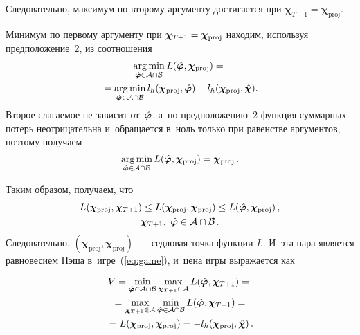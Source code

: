\begin{multicols}{2}
Следовательно, максимум по второму аргументу достигается при
$\boldsymbol{\chi}_{T+1} = \boldsymbol{\chi}_{\mathrm{proj}}$.

Минимум по первому аргументу при $\boldsymbol{\chi}_{T+1}\hm =
\boldsymbol{\chi}_{\mathrm{proj}}$ находим, используя
предположение~2, из соотношения
\begin{multline*}
    \mathop{\mathrm{arg}\,\mathrm{min}}\limits_{\hat{\boldsymbol{\varphi}} \in \mathcal{A} \cap \mathcal{B}} L(\hat{\boldsymbol{\varphi}},
    \boldsymbol{\chi}_{\mathrm{proj}}) ={}\\
    {}=
    \mathop{\mathrm{arg}\,\mathrm{min}}\limits_{\hat{\boldsymbol{\varphi}} \in \mathcal{A} \cap \mathcal{B}}
    l_h(\boldsymbol{\chi}_{\mathrm{proj}}, \hat{\boldsymbol{\varphi}})
    - l_h(\boldsymbol{\chi}_{\mathrm{proj}}, \hat{\boldsymbol{\chi}}).
\end{multline*}
Второе слагаемое не зависит от~$\hat{\boldsymbol{\varphi}}$, а~по предположению~2
функция суммарных потерь неотрицательна и~обращается в~ноль только при равенстве аргументов, поэтому
получаем
$$
    \mathop{\mathrm{arg}\,\mathrm{min}}\limits_{\hat{\boldsymbol{\varphi}} \in \mathcal{A} \cap \mathcal{B}}
    L(\hat{\boldsymbol{\varphi}}, \boldsymbol{\chi}_{\mathrm{proj}}) =
    \boldsymbol{\chi}_{\mathrm{proj}}\,.
$$

Таким образом, получаем, что
\begin{multline*}
   L(\boldsymbol{\chi}_{\mathrm{proj}}, \boldsymbol{\chi}_{T+1})  \leq
   L(\boldsymbol{\chi}_{\mathrm{proj}}, \boldsymbol{\chi}_{\mathrm{proj}})
   \leq L(\hat{\boldsymbol{\varphi}}, \boldsymbol{\chi}_{\mathrm{proj}})\,, \\
    \boldsymbol{\chi}_{T+1},~\hat{\boldsymbol{\varphi}} \in \mathcal{A} \cap \mathcal{B}\,.
\end{multline*}
Следовательно, $(\boldsymbol{\chi}_{\mathrm{proj}},
\boldsymbol{\chi}_{\mathrm{proj}})$~--- седловая точка функции $L$.
И~эта пара является равновесием Нэша в~игре~(\ref{eq:game}), и~цена
игры выражается как

\vspace*{-4pt}

\noindent
\begin{multline*}
    V = \min\limits_{\hat{\boldsymbol{\varphi}} \in \mathcal{A} \cap \mathcal{B}} \max\limits_{\boldsymbol{\chi}_{T+1} \in \mathcal{A}} L(\hat{\boldsymbol{\varphi}}, \boldsymbol{\chi}_{T+1}) ={}\\
    {}=
    \max\limits_{\boldsymbol{\chi}_{T+1} \in \mathcal{A}} \min\limits_{\hat{\boldsymbol{\varphi}} \in \mathcal{A} \cap
    \mathcal{B}} L(\hat{\boldsymbol{\varphi}}, \boldsymbol{\chi}_{T+1}) ={}\\
    {}=
    L(\boldsymbol{\chi}_{\mathrm{proj}},
    \boldsymbol{\chi}_{\mathrm{proj}})= -l_h(\boldsymbol{\chi}_{\mathrm{proj}}, \hat{\boldsymbol{\chi}})\,.
\end{multline*}


\end{multicols}
